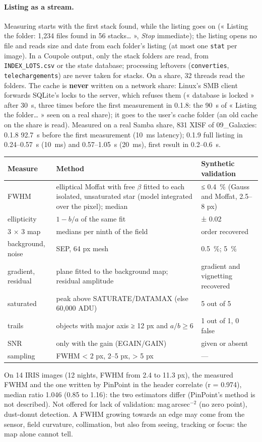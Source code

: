 \paragraph{Listing as a stream.} Measuring starts with the first stack found, while the listing goes on (« Listing
the folder: 1,234 files found in 56 stacks… », \emph{Stop} immediate); the listing opens no file and reads size and
date from each folder's listing (at most one \texttt{stat} per image). In a Coupole output, only the stack folders
are read, from \texttt{INDEX\_LOTS.csv} or the state database; processing leftovers (\texttt{converties},
\texttt{telechargements}) are never taken for stacks. On a share, 32 threads read the folders. The cache is
\textbf{never} written on a network share: Linux's SMB client forwards SQLite's locks to the server, which refuses
them (« database is locked » after 30~s, three times before the first measurement in 0.1.8: the 90~s of « Listing the
folder… » seen on a real share); it goes to the user's cache folder (an old cache on the share is read). Measured on
a real Samba share, 831 XISF of 09\_Galaxies: 0.1.8 92.7~s before the first measurement (10~ms latency); 0.1.9 full
listing in 0.24–0.57~s (10~ms) and 0.57–1.05~s (20~ms), first result in 0.2–0.6~s.

\begin{center}\small
\begin{tabularx}{\linewidth}{@{}lXl@{}}
\toprule
\textbf{Measure} & \textbf{Method} & \textbf{Synthetic validation}\\
\midrule
FWHM & elliptical Moffat with free $\beta$ fitted to each isolated, unsaturated star (model integrated over the pixel); median & ≤ 0.4~\% (Gauss and Moffat, 2.5–8 px)\\
ellipticity & $1-b/a$ of the same fit & ± 0.02\\
3 × 3 map & medians per ninth of the field & order recovered\\
background, noise & SEP, 64 px mesh & 0.5~\%; 5~\%\\
gradient, residual & plane fitted to the background map; residual amplitude & gradient and vignetting recovered\\
saturated & peak above SATURATE/DATAMAX (else 60,000 ADU) & 5 out of 5\\
trails & objects with major axis ≥ 12 px and $a/b \ge 6$ & 1 out of 1, 0 false\\
SNR & only with the gain (EGAIN/GAIN) & given or absent\\
sampling & FWHM < 2 px, 2–5 px, > 5 px & —\\
\bottomrule
\end{tabularx}
\end{center}
On 14 IRIS images (12 nights, FWHM from 2.4 to 11.3 px), the measured FWHM and the one written by PinPoint in the
header correlate (r = 0.974), median ratio 1.046 (0.85 to 1.16): the two estimators differ (PinPoint's method is
not described). Not offered for lack of validation: mag\,arcsec$^{-2}$ (no zero point), dust-donut detection. A FWHM
growing towards an edge may come from the sensor, field curvature, collimation, but also from seeing, tracking or
focus: the map alone cannot tell.


